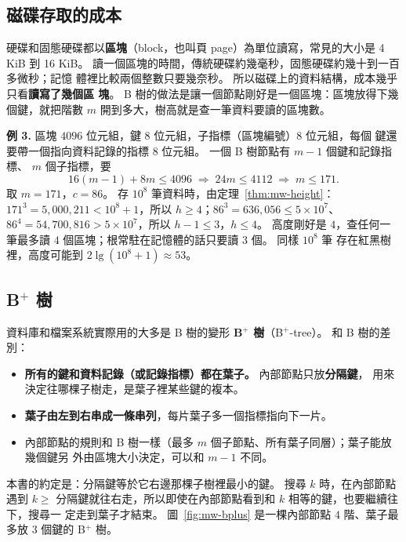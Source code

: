 \subsection{磁碟存取的成本}
\label{sec:mw-disk}

硬碟和固態硬碟都以\textbf{區塊}（block，也叫頁 page）為單位讀寫，常見的大小是 4 KiB
到 16 KiB。 讀一個區塊的時間，傳統硬碟約幾毫秒，固態硬碟約幾十到一百多微秒；記憶
體裡比較兩個整數只要幾奈秒。 所以磁碟上的資料結構，成本幾乎只看\textbf{讀寫了幾個區
塊}。 B 樹的做法是讓一個節點剛好是一個區塊：區塊放得下幾個鍵，就把階數 $m$
開到多大，樹高就是查一筆資料要讀的區塊數。

\textbf{例 3.} 區塊 $4096$ 位元組，鍵 $8$ 位元組，子指標（區塊編號）$8$ 位元組，每個
鍵還要帶一個指向資料記錄的指標 $8$ 位元組。 一個 B 樹節點有 $m - 1$ 個鍵和記錄指標、
$m$ 個子指標，要
\[
16(m - 1) + 8m \le 4096 \;\Longrightarrow\; 24m \le 4112 \;\Longrightarrow\; m \le 171.
\]
取 $m = 171$，$c = 86$。 存 $10^8$ 筆資料時，由定理~\ref{thm:mw-height}：
$171^3 = 5{,}000{,}211 < 10^8 + 1$，所以 $h \ge 4$；$86^3 = 636{,}056 \le 5 \times 10^7$、
$86^4 = 54{,}700{,}816 > 5 \times 10^7$，所以 $h - 1 \le 3$，$h \le 4$。 高度剛好是
$4$，查任何一筆最多讀 $4$ 個區塊；根常駐在記憶體的話只要讀 $3$ 個。 同樣 $10^8$ 筆
存在紅黑樹裡，高度可能到 $2\lg(10^8 + 1) \approx 53$。

\subsection{\texorpdfstring{B$^{+}$}{B+} 樹}

資料庫和檔案系統實際用的大多是 B 樹的變形 \textbf{B$^{+}$ 樹}（B$^{+}$-tree）。 和 B
樹的差別：
\begin{itemize}
\item \textbf{所有的鍵和資料記錄（或記錄指標）都在葉子。} 內部節點只放\textbf{分隔鍵}，
用來決定往哪棵子樹走，是葉子裡某些鍵的複本。
\item \textbf{葉子由左到右串成一條串列}，每片葉子多一個指標指向下一片。
\item 內部節點的規則和 B 樹一樣（最多 $m$ 個子節點、所有葉子同層）；葉子能放幾個鍵另
外由區塊大小決定，可以和 $m - 1$ 不同。
\end{itemize}

本書的約定是：分隔鍵等於它右邊那棵子樹裡最小的鍵。 搜尋 $k$ 時，在內部節點遇到
$k \ge$ 分隔鍵就往右走，所以即使在內部節點看到和 $k$ 相等的鍵，也要繼續往下，搜尋一
定走到葉子才結束。 圖~\ref{fig:mw-bplus} 是一棵內部節點 $4$ 階、葉子最多放 $3$ 個鍵的
B$^{+}$ 樹。

